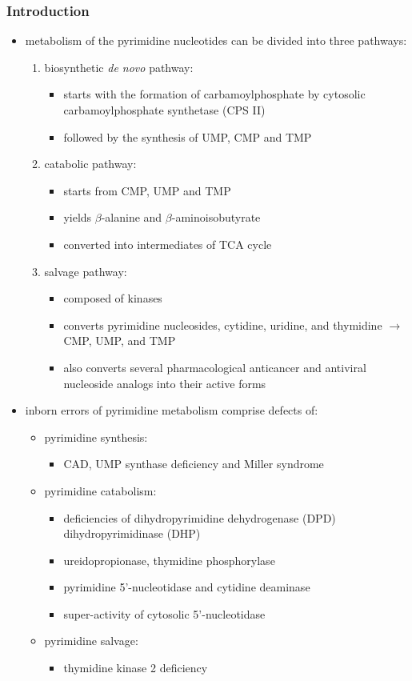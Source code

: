 \documentclass{scrartcl}
\begin{document}
\subsubsection{Introduction}
\label{sec:org2a72237}
\begin{itemize}
\item metabolism of the pyrimidine nucleotides can be divided into three
pathways:
\begin{enumerate}
\item biosynthetic \emph{de novo} pathway:
\begin{itemize}
\item starts with the formation of carbamoylphosphate by cytosolic
carbamoylphosphate synthetase (CPS II)
\item followed by the synthesis of UMP, CMP and TMP
\end{itemize}
\item catabolic pathway:
\begin{itemize}
\item starts from CMP, UMP and TMP
\item yields \(\beta\)-alanine and \(\beta\)-aminoisobutyrate
\item converted into intermediates of TCA cycle
\end{itemize}
\item salvage pathway:
\begin{itemize}
\item composed of kinases
\item converts pyrimidine nucleosides, cytidine, uridine, and
thymidine \(\to\) CMP, UMP, and TMP
\item also converts several pharmacological anticancer and antiviral
nucleoside analogs into their active forms
\end{itemize}
\end{enumerate}

\item inborn errors of pyrimidine metabolism comprise defects of:
\begin{itemize}
\item pyrimidine synthesis:
\begin{itemize}
\item CAD, UMP synthase deficiency and Miller syndrome
\end{itemize}
\item pyrimidine catabolism:
\begin{itemize}
\item deficiencies of dihydropyrimidine
dehydrogenase (DPD) dihydropyrimidinase (DHP)
\item ureidopropionase, thymidine phosphorylase
\item pyrimidine 5’-nucleotidase and cytidine deaminase
\item super-activity of cytosolic 5’-nucleotidase
\end{itemize}
\item pyrimidine salvage:
\begin{itemize}
\item thymidine kinase 2 deficiency
\end{itemize}
\end{itemize}
\end{itemize}
\end{document}
